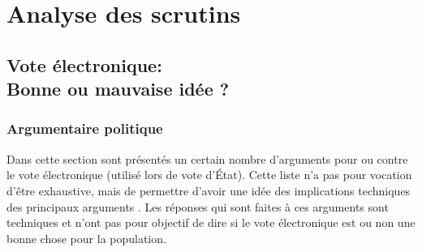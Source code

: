 \documentclass[../report]{subfiles}
\begin{document}
\newcommand\tabcritere[8]{
  \begin{center}
    \begin{tabular}{p{8em}|c|p{28em}}
      \hline
      Critère & Évaluation & Raison \\
      \hline
      \hline
      Avis des perdants & #1 & #2 \\
      \hline
      Indépendance aux petits candidats & #3 & #4 \\
      \hline
      Quasi unanimité du vote & #5 & #6 \\
      \hline
      Manipulabilité & #7 & #8 \\
      \hline
    \end{tabular}
  \end{center}
}



\part{Analyse des scrutins}

\chapter[Vote électronique: bonne ou mauvaise idée ?]{Vote électronique:\\Bonne ou mauvaise idée ?}

\section{Argumentaire politique}

Dans cette section sont présentés un certain nombre d'arguments pour ou contre le vote 
électronique (utilisé lors de vote d'État). 
Cette liste n'a pas pour vocation d'être exhaustive, mais de permettre d'avoir une idée
des implications techniques des principaux arguments \cite{olivier_elections_2022,jaberg_10_nodate}.
Les réponses qui sont faites à ces arguments sont techniques et n'ont pas pour objectif de dire si 
le vote électronique est ou non une bonne chose pour la population.
\end{document}
